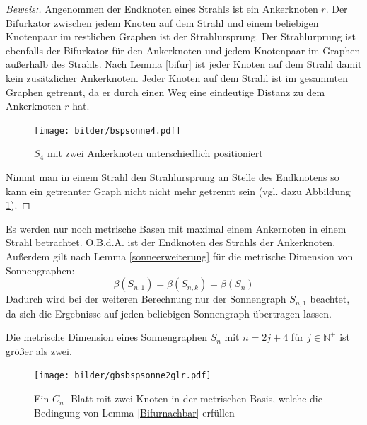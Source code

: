 \begin{proof}[Beweis:]
Angenommen der Endknoten eines Strahls ist ein Ankerknoten $r$. Der Bifurkator zwischen jedem Knoten auf dem Strahl und einem beliebigen Knotenpaar im restlichen Graphen ist der Strahlursprung. Der Strahlurprung ist ebenfalls der Bifurkator für den Ankerknoten und jedem Knotenpaar im Graphen außerhalb des Strahls. Nach Lemma \ref{bifur} ist jeder Knoten auf dem Strahl damit kein zusätzlicher Ankerknoten. Jeder Knoten auf dem Strahl ist im gesammten Graphen getrennt, da er durch einen Weg eine eindeutige Distanz zu dem Ankerknoten $r$ hat.\begin{figure}[h!]
		\centering
 		 \texttt{[image: bilder/bspsonne4.pdf]}
   \caption{$S_4$ mit zwei Ankerknoten unterschiedlich positioniert}
   \label{s4}
   \end{figure}
Nimmt man in einem Strahl den Strahlursprung an Stelle des Endknotens so kann ein getrennter Graph nicht nicht mehr getrennt sein (vgl. dazu Abbildung \ref{s4}).
\end{proof}
\begin{bem}
Es werden nur noch metrische Basen mit maximal einem Ankernoten in einem Strahl betrachtet. O.B.d.A. ist der Endknoten des Strahls der Ankerknoten. Außerdem gilt nach Lemma \ref{sonneerweiterung} für die metrische Dimension von Sonnengraphen: $$\beta(S_{n,1})=\beta(S_{n,k})=\beta(S_n)$$
Dadurch wird bei der weiteren Berechnung nur der Sonnengraph $S_{n,1}$ beachtet, da sich die Ergebnisse auf jeden beliebigen Sonnengraph übertragen lassen. 
\end{bem}
\begin{lem}
\label{mdgr2}
Die metrische Dimension eines Sonnengraphen $S_{n}$ mit $n = 2j+4$ für $j \in \mathbb{N}^+$ ist größer als zwei. 
\end{lem}
\vspace{-8mm}
 \begin{figure}[h!]
		\centering
 		 \texttt{[image: bilder/gbsbspsonne2glr.pdf]}
   \caption{Ein $C_{n}$- Blatt mit zwei Knoten in der metrischen Basis, welche die Bedingung von Lemma \ref{Bifurnachbar} erfüllen}
  	 \end{figure}
\vspace{-4mm}
  	 ~\linebreak

